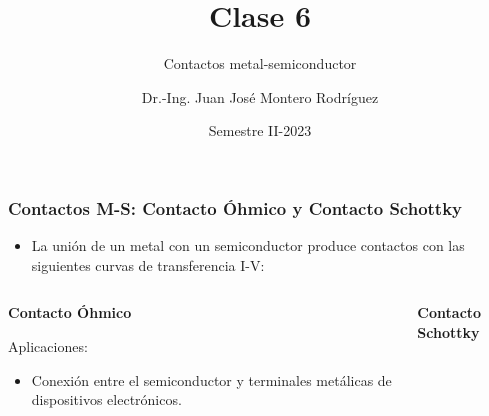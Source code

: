 \documentclass[10pt,t,aspectratio=169]{beamer}
\title{Clase 6}
\subtitle{Contactos metal-semiconductor}
\author{Dr.-Ing. Juan José Montero Rodríguez}
\institute{Escuela de Ingeniería Electrónica}
\date{Semestre II-2023}
\begin{document}
\begin{frame}[t]
\titlepage
\end{frame}




\begin{frame}[t]
    \frametitle{Contactos M-S: Contacto Óhmico y Contacto Schottky}

    \begin{itemize}
        \item La unión de un metal con un semiconductor produce contactos con las siguientes curvas de transferencia I-V:
    \end{itemize}

    \begin{columns}
        \begin{column}{0.5\textwidth}
            \centering
            \textbf{Contacto Óhmico}

            \begin{figure}[H]
                \centering
                \pgfplotsset{width=\textwidth,compat=1.9}
                \end{figure}

                \flushleft
                Aplicaciones:

                \begin{itemize}
                    \item Conexión entre el semiconductor y terminales metálicas de dispositivos electrónicos.
                \end{itemize}
        \end{column}
        \begin{column}{0.5\textwidth}
            \centering
            \textbf{Contacto Schottky}

            \begin{figure}[H]
                \centering
                \pgfplotsset{width=\textwidth,compat=1.9}
            \end{figure}


\end{column}
\end{columns}
\end{frame}
\end{document}
